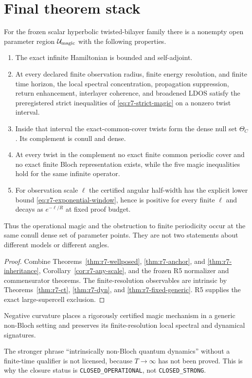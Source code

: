 \section{Final theorem stack}
\label{sec:r7-final-stack}

\begin{theorem}
\label{thm:r7-principal}
For the frozen scalar hyperbolic twisted-bilayer family there is a nonempty
open parameter region $\mathcal U_{\rm magic}$ with the following properties.
\begin{enumerate}
\item The exact infinite Hamiltonian is bounded and self-adjoint.
\item At every declared finite observation radius, finite energy resolution,
and finite time horizon, the local spectral concentration, propagation
suppression, return enhancement, interlayer coherence, and broadened LDOS
satisfy the preregistered strict inequalities of
\eqref{eq:r7-strict-magic} on a nonzero twist interval.
\item Inside that interval the exact-common-cover twists form the dense null
set $\Theta_C$.  Its complement is conull and dense.
\item At every twist in the complement no exact finite common periodic cover
and no exact finite Bloch representation exists, while the five magic
inequalities hold for the same infinite operator.
\item For observation scale $\ell$ the certified angular half-width has the
explicit lower bound \eqref{eq:r7-exponential-window}, hence is positive for
every finite $\ell$ and decays as $e^{-\ell/R}$ at fixed proof budget.
\end{enumerate}
Thus the operational magic and the obstruction to finite periodicity occur at
the same conull dense set of parameter points.  They are not two statements
about different models or different angles.
\end{theorem}

\begin{proof}
Combine Theorems~\ref{thm:r7-wellposed}, \ref{thm:r7-anchor}, and
\ref{thm:r7-inheritance}, Corollary~\ref{cor:r7-any-scale}, and the frozen R5
normalizer and commensurator theorems.  The finite-resolution observables are
intrinsic by Theorems~\ref{thm:r7-ct}, \ref{thm:r7-dyn}, and
\ref{thm:r7-fixed-generic}.  R5 supplies the exact large-supercell exclusion.
\end{proof}

\begin{corollary}
\label{cor:r7-paper-claim}
Negative curvature places a rigorously certified magic mechanism in a generic
non-Bloch setting and preserves its finite-resolution local spectral and
dynamical signatures.
\end{corollary}

The stronger phrase ``intrinsically non-Bloch quantum dynamics'' without a
finite-time qualifier is not licensed, because $T\to\infty$ has not been
proved.  This is why the closure status is \texttt{CLOSED\_OPERATIONAL}, not
\texttt{CLOSED\_STRONG}.
